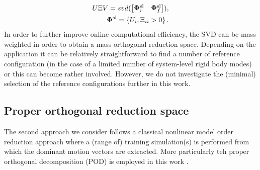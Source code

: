 \begin{eqnarray}
U\Xi V = svd(\begin{bmatrix} \bm \Phi^{\rm sl}_r & \bm \Phi^{\rm sl}_f\end{bmatrix}), \\
\bm \Phi^{\rm sl} = \left\{U_i, \Xi_{ii} > 0\right\}. 
\end{eqnarray}
In order to further improve online computational efficiency, the SVD can be mass weighted in order to obtain a mass-orthogonal reduction space. 
Depending on the application it can be relatively straightforward to find a number of reference configuration (in the case of a limited number of system-level rigid body modes) or this can become rather involved. However, we do not investigate the (minimal) selection of the reference configurations further in this work. 


\subsection{Proper orthogonal reduction space}

The second approach we consider follows a classical nonlinear model order reduction approach where a (range of) training simulation(s) is performed from which the dominant motion vectors are extracted. More particularly teh proper orthogonal decomposition (POD) is employed in this work \cite{POD}.


